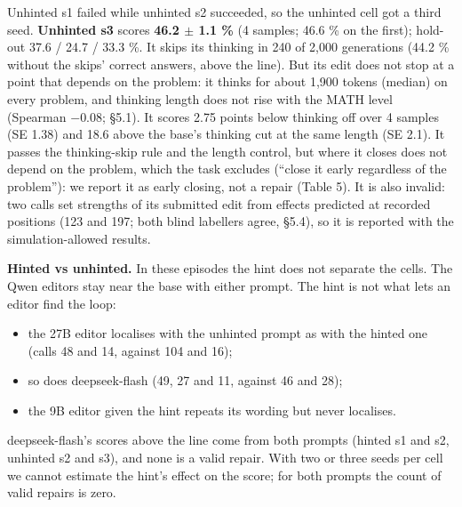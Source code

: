\documentclass[
  10pt,
]{article}
\newcounter{none} %
\providecommand{\tightlist}{%
  \setlength{\itemsep}{0pt}\setlength{\parskip}{0pt}}
\begin{document}
Unhinted s1 failed while unhinted s2 succeeded, so the unhinted cell got
a third seed. \textbf{Unhinted s3} scores \textbf{46.2 \ensuremath{\pm} 1.1 \%} (4
samples; 46.6 \% on the first); hold-out 37.6 / 24.7 / 33.3 \%. It skips
its thinking in 240 of 2,000 generations (44.2 \% without the skips'
correct answers, above the line). But its edit does not stop at a point
that depends on the problem: it thinks for about 1,900 tokens (median)
on every problem, and thinking length does not rise with the MATH level
(Spearman \ensuremath{-}0.08; \S{}5.1). It scores 2.75 points below thinking off over 4
samples (SE 1.38) and 18.6 above the base's thinking cut at the same
length (SE 2.1). It passes the thinking-skip rule and the length
control, but where it closes does not depend on the problem, which the
task excludes (``close it early regardless of the problem''): we report
it as early closing, not a repair (Table 5). It is also invalid: two
calls set strengths of its submitted edit from effects predicted at
recorded positions (123 and 197; both blind labellers agree, \S{}5.4), so
it is reported with the simulation-allowed results.

\textbf{Hinted vs unhinted.} In these episodes the hint does not
separate the cells. The Qwen editors stay near the base with either
prompt. The hint is not what lets an editor find the loop:

\begin{itemize}
\tightlist
\item
  the 27B editor localises with the unhinted prompt as with the hinted
  one (calls 48 and 14, against 104 and 16);
\item
  so does deepseek-flash (49, 27 and 11, against 46 and 28);
\item
  the 9B editor given the hint repeats its wording but never localises.
\end{itemize}

deepseek-flash's scores above the line come from both prompts (hinted s1
and s2, unhinted s2 and s3), and none is a valid repair. With two or
three seeds per cell we cannot estimate the hint's effect on the score;
for both prompts the count of valid repairs is zero.
\end{document}
